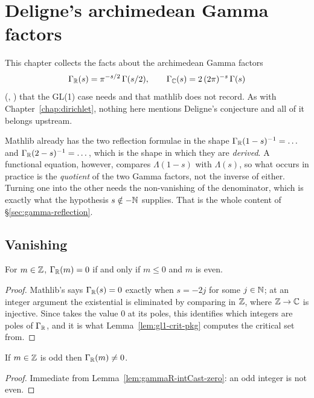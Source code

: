 \chapter{Deligne's archimedean Gamma factors}
\label{chap:gamma}

This chapter collects the facts about the archimedean Gamma factors
\[ \Gamma_{\mathbb{R}}(s) = \pi^{-s/2}\,\Gamma(s/2), \qquad
   \Gamma_{\mathbb{C}}(s) = 2\,(2\pi)^{-s}\,\Gamma(s) \]
(, ) that the GL(1) case needs and that mathlib
does not record. As with Chapter~\ref{chap:dirichlet}, nothing here mentions Deligne's
conjecture and all of it belongs upstream.

Mathlib already has the two reflection formulae in the shape
$\Gamma_{\mathbb{R}}(1-s)^{-1} = \dots$ and $\Gamma_{\mathbb{R}}(2-s)^{-1} = \dots$, which is the shape in
which they are \emph{derived}. A functional equation, however, compares $\Lambda(1-s)$ with
$\Lambda(s)$, so what occurs in practice is the \emph{quotient} of the two Gamma factors, not
the inverse of either. Turning one into the other needs the non-vanishing of the denominator,
which is exactly what the hypothesis $s \notin -\mathbb{N}$ supplies. That is the whole content of
\S\ref{sec:gamma-reflection}.

\section{Vanishing}
\label{sec:gamma-vanishing}

\begin{lemma}
  \label{lem:gammaR-intCast-zero}
  \leanok
  For $m \in \mathbb{Z}$, $\Gamma_{\mathbb{R}}(m) = 0$ if and only if $m \leq 0$ and $m$ is even.
\end{lemma}
\begin{proof}
  \leanok
  Mathlib's  says $\Gamma_{\mathbb{R}}(s) = 0$ exactly when
  $s = -2j$ for some $j \in \mathbb{N}$; at an integer argument the existential is eliminated by
  comparing in $\mathbb{Z}$, where $\mathbb{Z} \to \mathbb{C}$ is injective. Since  takes the value
  $0$ at its poles, this identifies which integers are poles of $\Gamma_{\mathbb{R}}$, and it is what
  Lemma~\ref{lem:gl1-crit-pkg} computes the critical set from.
\end{proof}

\begin{lemma}
  \label{lem:gammaR-odd-ne-zero}
  \leanok
  If $m \in \mathbb{Z}$ is odd then $\Gamma_{\mathbb{R}}(m) \neq 0$.
\end{lemma}
\begin{proof}
  \leanok
  Immediate from Lemma~\ref{lem:gammaR-intCast-zero}: an odd integer is not even.
\end{proof}

